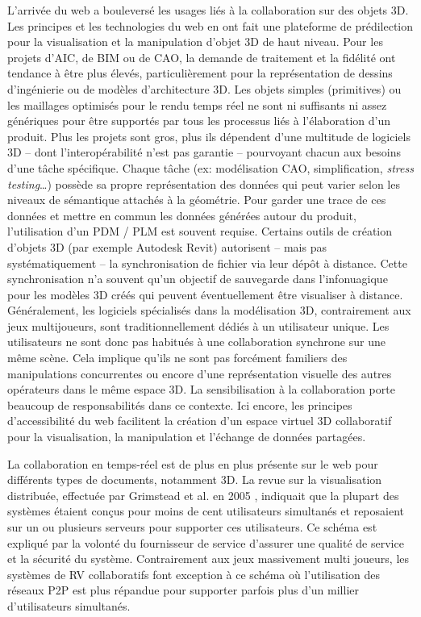 L'arrivée du web a bouleversé les usages liés à la collaboration sur des objets 
\gls{3D}. 
Les principes et les technologies du web en ont fait une plateforme 
de prédilection pour la visualisation et la manipulation d'objet \gls{3D} de haut 
niveau.   
Pour les projets d'\gls{AIC}, de \gls{BIM} ou de \gls{CAO}, la demande de traitement et la fidélité 
ont tendance à être plus élevés, particulièrement pour la représentation de dessins 
d'ingénierie ou de modèles d'architecture \gls{3D}. 
Les objets simples (primitives) ou les maillages optimisés pour le rendu temps réel 
ne sont ni suffisants ni assez génériques pour être supportés par tous les 
processus liés à l'élaboration d'un produit. 
Plus les projets sont gros, plus ils dépendent d'une multitude de logiciels \gls{3D} 
--  
dont l'interopérabilité n'est pas garantie -- pourvoyant chacun aux besoins d'une 
tâche spécifique. 
Chaque tâche (ex: modélisation \gls{CAO}, simplification, \textit{stress testing}\ldots) possède sa 
propre représentation des données qui peut varier selon les niveaux de 
sémantique attachés à la géométrie. 
Pour garder une trace de ces données et mettre en commun les données 
générées autour du produit, l'utilisation d'un \gls{PDM} / \gls{PLM} est 
souvent requise. Certains outils de création d'objets \gls{3D} (par exemple 
Autodesk Revit) autorisent -- mais pas systématiquement -- la synchronisation de fichier
via leur dépôt à distance. 
Cette synchronisation n'a souvent qu'un objectif de sauvegarde dans l'infonuagique pour
les modèles 3D créés qui peuvent éventuellement être visualiser à distance.
Généralement, les logiciels spécialisés dans la modélisation \gls{3D}, contrairement aux 
jeux multijoueurs, sont traditionnellement dédiés à un utilisateur unique. Les utilisateurs
ne sont donc pas habitués à une collaboration synchrone sur une même scène. Cela implique 
qu'ils ne sont pas forcément familiers des manipulations concurrentes ou encore d'une 
représentation visuelle des autres opérateurs dans le même espace \gls{3D}. La sensibilisation 
à la collaboration porte beaucoup de responsabilités dans ce contexte. 
Ici encore, les principes d'accessibilité du web facilitent la création d'un espace 
virtuel \gls{3D} collaboratif pour la visualisation, la manipulation et l'échange de
données partagées. 


La collaboration en temps-réel est de plus en plus présente sur le web pour 
différents types de documents, notamment \gls{3D}.
La revue sur la visualisation distribuée, effectuée par Grimstead et al. en 2005 
\cite{Grimstead2005}, indiquait que la plupart des systèmes étaient conçus pour 
moins de cent utilisateurs simultanés et reposaient sur un ou plusieurs serveurs 
pour supporter ces utilisateurs. Ce schéma est expliqué par la volonté du 
fournisseur de service d'assurer une 
qualité de service et la sécurité du système. 
Contrairement aux jeux massivement multi joueurs, les systèmes de \gls{RV} collaboratifs 
font exception à ce schéma où l'utilisation des réseaux \gls{P2P} est plus répandue 
pour supporter parfois plus d'un millier d'utilisateurs simultanés. 


